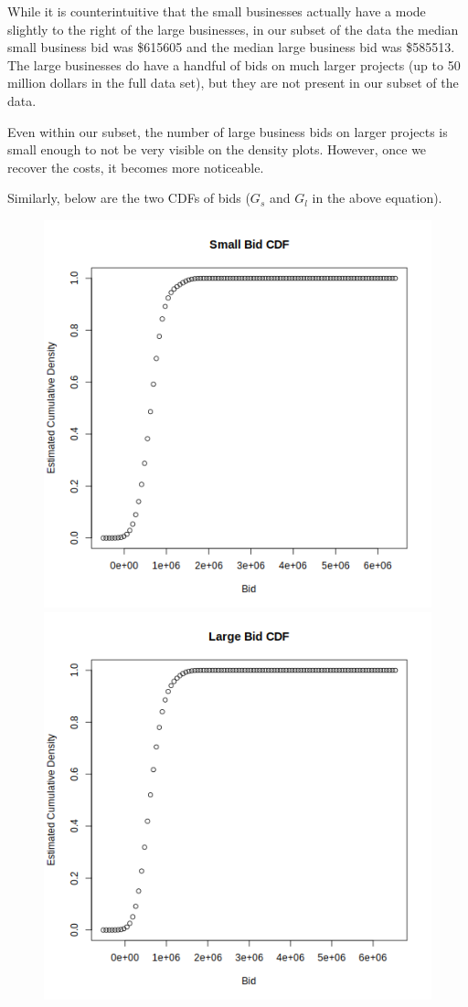 While it is counterintuitive that the small businesses actually have a mode
slightly to the right of the large businesses, in our subset of the data the median
small business bid was \$615605 and the median large business bid was \$585513.
The large businesses do have a handful of bids on much larger projects (up to
50 million dollars in the full data set), but they are not present in our
subset of the data.

Even within our subset, the number of large business bids on larger projects
is small enough to not be very visible on the density plots. However,
once we recover the costs, it becomes more noticeable.

\newpage
Similarly, below are the two CDFs of bids (\(G_s\) and \(G_l\) in the above
equation).
\begin{figure}[ht!]
\includegraphics[scale=0.5]{imgs/G_s.png}
\includegraphics[scale=0.5]{imgs/G_l.png}
\end{figure}

